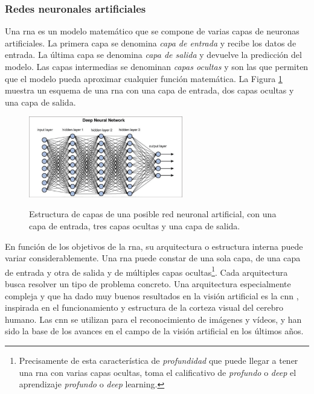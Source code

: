 \subsubsection{Redes neuronales artificiales}
Una \gls{rna} es un modelo matemático que se compone de varias capas de neuronas artificiales. La primera capa se denomina \emph{capa de entrada} y recibe los datos de entrada. La última capa se denomina \emph{capa de salida} y devuelve la predicción del modelo. Las capas intermedias se denominan \emph{capas ocultas} y son las que permiten que el modelo pueda aproximar cualquier función matemática. La Figura \ref{fig:deep_neural_network} muestra un esquema de una \gls{rna} con una capa de entrada, dos capas ocultas y una capa de salida.


\begin{figure}[H]
    \caption[Estructura de capas de una posible red neuronal artificial]{Estructura de capas de una posible red neuronal artificial, con una capa de entrada, tres capas ocultas y una capa de salida.}
    \centering
    \includegraphics[width=0.6\textwidth]{./figuras/Deep_neural_network.png}
    \label{fig:deep_neural_network}
\end{figure}

En función de los objetivos de la \gls{rna}, su arquitectura o estructura interna puede variar considerablemente. Una \gls{rna} puede constar de una sola capa, de una capa de entrada y otra de salida y de múltiples capas ocultas\footnote{Precisamente de esta característica de \emph{profundidad} que puede llegar a tener una \gls{rna} con varias capas ocultas, toma el calificativo de \emph{profundo} o \emph{deep} el aprendizaje \emph{profundo} o \emph{deep} learning.}. Cada arquitectura busca resolver un tipo de problema concreto. Una arquitectura especialmente compleja y que ha dado muy buenos resultados en la visión artificial es la \gls{cnn} \citep{osheaIntroductionConvolutionalNeural2015}, inspirada en el funcionamiento y estructura de la corteza visual del cerebro humano. Las \gls{cnn} se utilizan para el reconocimiento de imágenes y vídeos, y han sido la base de los avances en el campo de la visión artificial en los últimos años.

